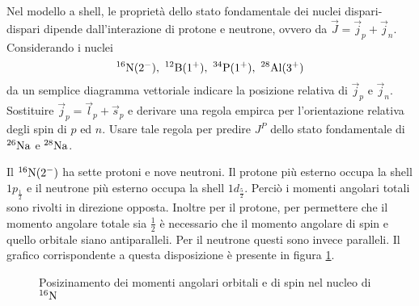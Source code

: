 \documentclass[../main.tex]{subfiles}
\begin{document}
	\begin{ese}[7.5]
		Nel modello a shell, le proprietà dello stato fondamentale dei nuclei dispari-dispari dipende dall'interazione di protone e neutrone, ovvero da $ \vec{J}=\vec{j}_{p}+\vec{j}_{n} $. Considerando i nuclei $$ ^{16}\chem{N}(2^{-}),\ ^{12}\chem{B}(1^{+}),\ ^{34}\chem{P}(1^{+}),\ ^{28}\chem{Al}(3^{+}) $$ da un semplice diagramma vettoriale indicare la posizione relativa di $ \vec{j}_{p} $ e $ \vec{j}_{n} $. Sostituire $ \vec{j}_{p}=\vec{l}_{p}+\vec{s}_{p} $ e derivare una regola empirca per l'orientazione relativa degli spin di $ p $ ed $ n $. Usare tale regola per predire $ J^{P} $ dello stato fondamentale di $ ^{26}\mathrm{Na} $ e $ ^{28}\mathrm{Na} $.
	\end{ese}
	\begin{svol}
		Il $ ^{16}\mathrm{N}(2^{-}) $ ha sette protoni e nove neutroni. Il protone più esterno occupa la shell $ 1p_{\frac{1}{2}} $ e il neutrone più esterno occupa la shell $ 1d_{\frac{5}{2}} $. Perciò i momenti angolari totali sono rivolti in direzione opposta. Inoltre per il protone, per permettere che il momento angolare totale sia $ \frac{1}{2} $ è necessario che il momento angolare di spin e quello orbitale siano antiparalleli. Per il neutrone questi sono invece paralleli. Il grafico corrispondente a questa disposizione è presente in figura \ref{fig:16N}.
		\begin{figure}[h]
			\centering
			\caption{Posizinamento dei momenti angolari orbitali e di spin nel nucleo di $ ^{16}\mathrm{N} $}\label{fig:16N}
		\end{figure}

	
		

\end{svol}
\end{document}
